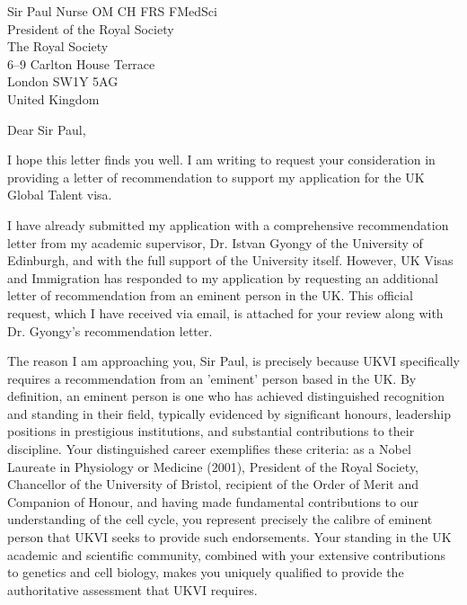 \documentclass[12pt,a4paper]{letter}
\begin{document}
\begin{letter}{Sir Paul Nurse OM CH FRS FMedSci\\President of the Royal Society\\The Royal Society\\6--9 Carlton House Terrace\\London SW1Y 5AG\\United Kingdom}

\date{\today}

\opening{Dear Sir Paul,}

I hope this letter finds you well. I am writing to request your consideration in providing a letter of recommendation to support my application for the UK Global Talent visa.

I have already submitted my application with a comprehensive recommendation letter from my academic supervisor, Dr. Istvan Gyongy of the University of Edinburgh, and with the full support of the University itself. However, UK Visas and Immigration has responded to my application by requesting an additional letter of recommendation from an eminent person in the UK. This official request, which I have received via email, is attached for your review along with Dr. Gyongy's recommendation letter.

The reason I am approaching you, Sir Paul, is precisely because UKVI specifically requires a recommendation from an 'eminent' person based in the UK. By definition, an eminent person is one who has achieved distinguished recognition and standing in their field, typically evidenced by significant honours, leadership positions in prestigious institutions, and substantial contributions to their discipline. Your distinguished career exemplifies these criteria: as a Nobel Laureate in Physiology or Medicine (2001), President of the Royal Society, Chancellor of the University of Bristol, recipient of the Order of Merit and Companion of Honour, and having made fundamental contributions to our understanding of the cell cycle, you represent precisely the calibre of eminent person that UKVI seeks to provide such endorsements. Your standing in the UK academic and scientific community, combined with your extensive contributions to genetics and cell biology, makes you uniquely qualified to provide the authoritative assessment that UKVI requires.


\end{letter}
\end{document}
